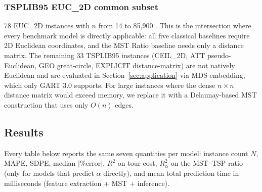 \begin{table}[!ht]
\centering
\caption{2D benchmark dataset composition (2{,}580 instances total).}
\label{tab:dataset_counts}
\end{table}

\subsubsection{TSPLIB95 EUC\_2D common subset}
78 EUC\_2D instances with $n$ from 14 to 85{,}900 \citep{reinelt1991tsplib}. This is the intersection where every benchmark model is directly applicable: all five classical baselines require 2D Euclidean coordinates, and the MST Ratio baseline needs only a distance matrix. The remaining 33 TSPLIB95 instances (CEIL\_2D, ATT pseudo-Euclidean, GEO great-circle, EXPLICIT distance-matrix) are not natively Euclidean and are evaluated in Section~\ref{sec:application} via MDS embedding, which only GART 3.0 supports. For large instances where the dense $n \times n$ distance matrix would exceed memory, we replace it with a Delaunay-based MST construction \citep{delaunay1934} that uses only $O(n)$ edges.

\subsection{Results} \label{subsec:results}

Every table below reports the same seven quantities per model: instance count $N$, MAPE, SDPE, median $|\%\text{error}|$, $R^2$ on tour cost, $R^2_\alpha$ on the MST--TSP ratio (only for models that predict $\alpha$ directly), and mean total prediction time in milliseconds (feature extraction + MST + inference).


